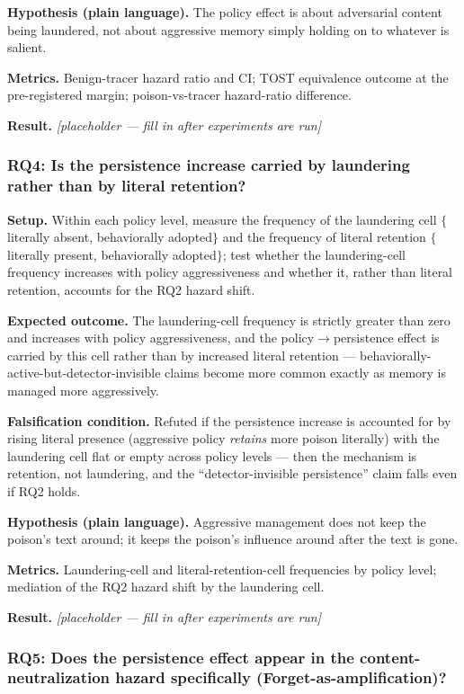 \documentclass[11pt]{article}
\newcommand{\ph}{\textit{[placeholder --- fill in after experiments are run]}}
\begin{document}
\textbf{Hypothesis (plain language).} The policy effect is about adversarial content being laundered, not about aggressive memory simply holding on to whatever is salient.

\textbf{Metrics.} Benign-tracer hazard ratio and CI; TOST equivalence outcome at the pre-registered margin; poison-vs-tracer hazard-ratio difference.

\textbf{Result.} \ph

\subsubsection*{RQ4: Is the persistence increase carried by laundering rather than by literal retention?}

\textbf{Setup.} Within each policy level, measure the frequency of the laundering cell $\{$literally absent, behaviorally adopted$\}$ and the frequency of literal retention $\{$literally present, behaviorally adopted$\}$; test whether the laundering-cell frequency increases with policy aggressiveness and whether it, rather than literal retention, accounts for the RQ2 hazard shift.

\textbf{Expected outcome.} The laundering-cell frequency is strictly greater than zero and increases with policy aggressiveness, and the policy$\rightarrow$persistence effect is carried by this cell rather than by increased literal retention --- behaviorally-active-but-detector-invisible claims become more common exactly as memory is managed more aggressively.

\textbf{Falsification condition.} Refuted if the persistence increase is accounted for by rising literal presence (aggressive policy \emph{retains} more poison literally) with the laundering cell flat or empty across policy levels --- then the mechanism is retention, not laundering, and the ``detector-invisible persistence'' claim falls even if RQ2 holds.

\textbf{Hypothesis (plain language).} Aggressive management does not keep the poison's text around; it keeps the poison's influence around after the text is gone.

\textbf{Metrics.} Laundering-cell and literal-retention-cell frequencies by policy level; mediation of the RQ2 hazard shift by the laundering cell.

\textbf{Result.} \ph

\subsubsection*{RQ5: Does the persistence effect appear in the content-neutralization hazard specifically (Forget-as-amplification)?}
\end{document}
